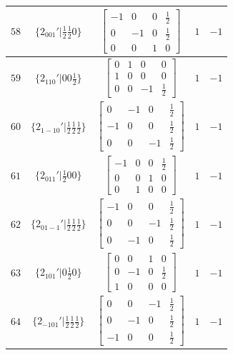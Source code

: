\documentclass[fleqn,8pt]{jsarticle}
\begin{document}
\begin{longtable}{ccccc}
$ 58 $ & $ \{2{}_{001}{}'|\frac{1}{2} \frac{1}{2} 0\} $ & $ \begin{bmatrix} -1 & 0 & 0 & \frac{1}{2} \\ 0 & -1 & 0 & \frac{1}{2} \\ 0 & 0 & 1 & 0 \end{bmatrix} $ & $ 1 $ & $ -1 $ \\ \hline
$ 59 $ & $ \{2{}_{110}{}'|0 0 \frac{1}{2}\} $ & $ \begin{bmatrix} 0 & 1 & 0 & 0 \\ 1 & 0 & 0 & 0 \\ 0 & 0 & -1 & \frac{1}{2} \end{bmatrix} $ & $ 1 $ & $ -1 $ \\ \hline
$ 60 $ & $ \{2{}_{1-10}{}'|\frac{1}{2} \frac{1}{2} \frac{1}{2}\} $ & $ \begin{bmatrix} 0 & -1 & 0 & \frac{1}{2} \\ -1 & 0 & 0 & \frac{1}{2} \\ 0 & 0 & -1 & \frac{1}{2} \end{bmatrix} $ & $ 1 $ & $ -1 $ \\ \hline
$ 61 $ & $ \{2{}_{011}{}'|\frac{1}{2} 0 0\} $ & $ \begin{bmatrix} -1 & 0 & 0 & \frac{1}{2} \\ 0 & 0 & 1 & 0 \\ 0 & 1 & 0 & 0 \end{bmatrix} $ & $ 1 $ & $ -1 $ \\ \hline
$ 62 $ & $ \{2{}_{01-1}{}'|\frac{1}{2} \frac{1}{2} \frac{1}{2}\} $ & $ \begin{bmatrix} -1 & 0 & 0 & \frac{1}{2} \\ 0 & 0 & -1 & \frac{1}{2} \\ 0 & -1 & 0 & \frac{1}{2} \end{bmatrix} $ & $ 1 $ & $ -1 $ \\ \hline
$ 63 $ & $ \{2{}_{101}{}'|0 \frac{1}{2} 0\} $ & $ \begin{bmatrix} 0 & 0 & 1 & 0 \\ 0 & -1 & 0 & \frac{1}{2} \\ 1 & 0 & 0 & 0 \end{bmatrix} $ & $ 1 $ & $ -1 $ \\ \hline
$ 64 $ & $ \{2{}_{-101}{}'|\frac{1}{2} \frac{1}{2} \frac{1}{2}\} $ & $ \begin{bmatrix} 0 & 0 & -1 & \frac{1}{2} \\ 0 & -1 & 0 & \frac{1}{2} \\ -1 & 0 & 0 & \frac{1}{2} \end{bmatrix} $ & $ 1 $ & $ -1 $ \\ \hline

\end{longtable}
\end{document}
